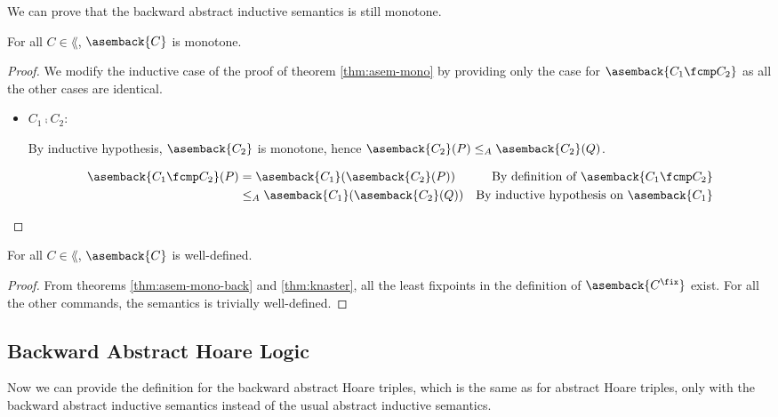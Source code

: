 We can prove that the backward abstract inductive semantics is still monotone.

\begin{theorem}[Monotonicity]
  \label{thm:asem-mono-back} 
  For all $C \in \lang$, $\asemback{C}$ is monotone.
\end{theorem}

\begin{proof}
  We modify the inductive case of the proof of theorem \ref{thm:asem-mono} by
  providing only the case for $\asemback{C_1 \fcmp C_2}$ as all the other cases
  are identical.

  \begin{itemize}
    \item $C_1 \fcmp C_2$:

      By inductive hypothesis, $\asemback{C_2}$ is monotone, hence
      $\asemback{C_2}(P) \leq_A \asemback{C_2}(Q)$.

      \begin{align*}
        \asemback{C_1 \fcmp C_2}(P) 
          &= \asemback{C_1}(\asemback{C_2}(P))
          &\text{By definition of $\asemback{C_1 \fcmp C_2}$}\\
          &\leq_A \asemback{C_1}(\asemback{C_2}(Q))
          &\text{By inductive hypothesis on $\asemback{C_1}$} \\
      \end{align*}
  \end{itemize}
\end{proof}

\begin{lemma}
  For all $C \in \lang$, $\asemback{C}$ is well-defined.
\end{lemma}
\begin{proof}
  From theorems \ref{thm:asem-mono-back} and \ref{thm:knaster}, all the least
  fixpoints in the definition of $\asemback{C^\fix}$ exist. For all the other
  commands, the semantics is trivially well-defined.
\end{proof}

\subsection{Backward Abstract Hoare Logic}

Now we can provide the definition for the backward abstract Hoare triples,
which is the same as for abstract Hoare triples, only with the backward
abstract inductive semantics instead of the usual abstract inductive semantics.

